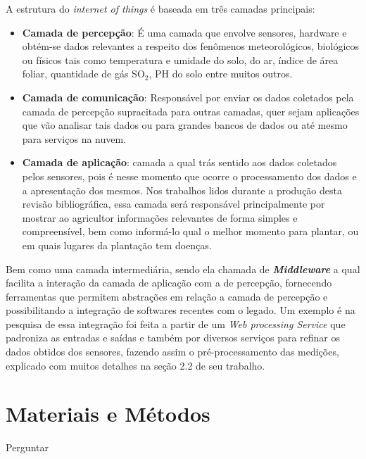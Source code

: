 \documentclass[
article,			%
12pt,				%
oneside,			%
a4paper,			%
english,			%
brazil,				%
sumario=tradicional
]{abntex2}
\begin{document}
A estrutura do \textit{internet of things} é baseada em três camadas principais\cite{5}:
  \begin{itemize}
      \item \textbf{Camada de percepção}: É uma camada que envolve sensores, hardware e obtém-se dados relevantes a respeito dos fenômenos meteorológicos, biológicos ou físicos tais como  temperatura e umidade do solo\cite{3}, do ar\cite{9}, índice de área foliar\cite{8}, quantidade de gás SO$_{2}$\cite{13}, PH do solo\cite{13} entre muitos outros.
      \item \textbf{Camada de comunicação}: Responsável por enviar os dados coletados pela camada de percepção supracitada para outras camadas, quer sejam aplicações que vão analisar tais dados ou para grandes bancos de dados ou até mesmo para serviços na nuvem.
      \item \textbf{Camada de aplicação}: camada a qual trás sentido aos dados coletados pelos sensores, pois é nesse momento que ocorre o processamento dos dados e a apresentação dos mesmos. Nos trabalhos lidos durante a produção desta revisão bibliográfica, essa camada será responsável principalmente por mostrar ao agricultor informações relevantes de forma simples e compreensível, bem como informá-lo qual o melhor momento para plantar\cite{1}, ou em quais lugares da plantação tem doenças\cite{2}.
      \end{itemize}

		Bem como uma camada intermediária, sendo ela chamada de \textit{\bfseries Middleware} a qual facilita a interação da camada de aplicação com a de percepção\cite{5}, fornecendo ferramentas que permitem abstrações em relação a camada de percepção e possibilitando a integração de softwares recentes com o legado\cite{5}. Um exemplo é na pesquisa de \citeauthor{6} essa integração foi feita a partir de um \textit{Web processing Service} que padroniza as entradas e saídas e também por diversos serviços para refinar os dados obtidos dos sensores, fazendo assim o pré-processamento das medições, explicado com muitos detalhes na seção 2.2 de seu trabalho.

\section{Materiais e Métodos}\label{Materiais e Métodos}
Perguntar
\end{document}

